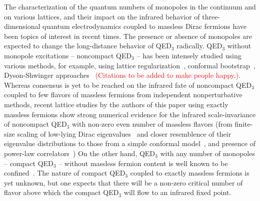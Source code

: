 \documentclass[prd, onecolumn, superscriptaddress, nofootinbib, notitlepage, floatfix]{revtex4-1}
\begin{document}
The characterization of the quantum numbers of monopoles in the continuum and on 
various lattices, and their impact on the infrared behavior of three-dimensional
quantum electrodynamics coupled to massless Dirac fermions have
been topics of interest in recent times. The presence or absence
of monopoles are expected to change the long-distance behavior of
QED$_3$ radically.  QED$_3$ without monopole excitations -- noncompact
QED$_3$ -- has been intensely studied using various methods, for example, using lattice
regularization~\cite{}, conformal bootstrap~\cite{}, Dyson-Shwinger
approaches~\cite{} \textcolor{red}{(Citations to be added to make 
people happy.)}.  Whereas consensus is yet to be reached on the
infrared fate of noncompact QED$_3$ coupled to few flavors of
massless fermions from independent nonperturbative methods, recent
lattice studies by the authors of this paper using exactly massless fermions
show strong numerical evidence for the infrared scale-invariance
of noncompact QED$_3$ with non-zero even number of massless flavors
(from finite-size scaling of low-lying Dirac
eigenvalues~\cite{Karthik:2015sgq,Karthik:2016ppr} and closer
resemblence of their eigenvalue distributions to those from a simple
conformal model~\cite{Karthik:2020shl}, and presence of power-law
correlators~\cite{Karthik:2016ppr,Karthik:2017hol}) On the other
hand, QED$_3$ with any number of monopoles -- compact QED$_3$ -- without
massless fermion content is well known to be
confined~\cite{Polyakov:1975rs,Polyakov:1976fu}. The nature of
compact QED$_3$ coupled to exactly massless fermions is yet unknown,
but one expects that there will be a non-zero critical number of
flavor above which the compact QED$_3$ will flow to an infrared
fixed point.
\end{document}
